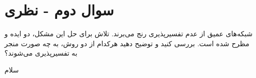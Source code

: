\section{سوال دوم - نظری}


شبکه‌های عمیق از عدم تفسیر‌پذیری رنج می‌برند. تلاش برای حل این مشکل، دو ایده  و  مظرح شده است. بررسی کنید و توضیح دهید هرکدام از دو روش، به چه صورت منجر به تفسیرپذیری می‌شوند؟



\begin{qsolve}
	سلام
\end{qsolve}